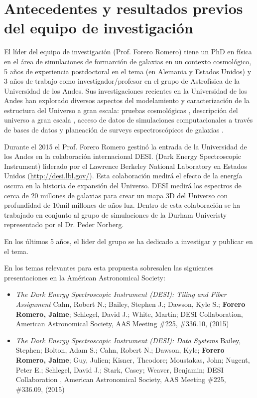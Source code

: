 \section{Antecedentes y resultados previos del equipo de
  investigaci\'on} 

El l\'ider del equipo de investigaci\'on (Prof. Forero Romero) tiene un PhD en f\'isica en el \'area de simulaciones de formarci\'on de galaxias en un  contexto
cosmol\'ogico, 5 a\~nos de experiencia postdoctoral en el tema (en
Alemania y Estados Unidos) y 3 a\~nos de trabajo como
investigador/profesor en el grupo de  Astrof\'isica de la Universidad
de los Andes. 
Sus investigaciones recientes en la Universidad de los Andes han
explorado diversos aspectos del modelamiento y caracterizaci\'on de la
estructura del Universo a gran  escala: pruebas cosmol\'ogicas
\cite{2014ApJ...796..137L}, descripci\'on del universo a gran escala
\cite{2014MNRAS.443.1090F,2013MNRAS.428.2489L,2012MNRAS.425.2049H},
acceso de datos de simulaciones computacionales a trav\'es de bases de
datos \cite{2013AN....334..691R} y planeaci\'on de surveys
espectrosc\'opicos de galaxias \cite{2014SPIE.9150E..23S}.
  

Durante el 2015 el Prof. Forero Romero gestin\'o la entrada de la
Universidad de los Andes en la colaboraci\'on internacional
DESI. (Dark Energy Spectroscopic Instrument) liderado por el Lawrence 
Berkeley National Laboratory en Estados Unidos
(\url{http://desi.lbl.gov/}). 
Esta colaboraci\'on medir\'a el efecto
de la energ\'ia oscura en la historia de expansi\'on del
Universo. 
DESI medir\'a los espectros de cerca de 20 millones de galaxias
para crear un mapa 3D del Universo con  profundidad de 10mil
millones de a\~nos luz. 
Dentro de esta colaboraci\'on se ha trabajado en conjunto al grupo de
simulaciones de la Durham Univeristy representado por el Dr. Peder
Norberg.  



En los \'ultimos 5 a\~nos, el lider del grupo se ha dedicado a
investigar y publicar en el tema. 

En los temas relevantes para esta propuesta sobresalen las siguientes 
presentaciones en la Am\'erican Astronomical Society:


\begin{itemize}
\item {\it The Dark Energy Spectroscopic Instrument (DESI): Tiling and
  Fiber Assignment} Cahn, Robert N.; Bailey, Stephen J.; Dawson, Kyle
  S.; {\bf Forero Romero, Jaime}; Schlegel, David J.; White, Martin;
  DESI Collaboration, American Astronomical Society, AAS Meeting \#225,
  \#336.10, (2015)
\item {\it The Dark Energy Spectroscopic Instrument (DESI): Data
  Systems} 	
	Bailey, Stephen; Bolton, Adam S.; Cahn, Robert N.; Dawson,
        Kyle; {\bf Forero Romero, Jaime}; Guy, Julien; Kisner, Theodore;
        Moustakas, John; Nugent, Peter E.; Schlegel, David J.; Stark,
        Casey; Weaver, Benjamin; DESI Collaboration , American
        Astronomical Society, AAS Meeting \#225, \#336.09, (2015)
\end{itemize}


